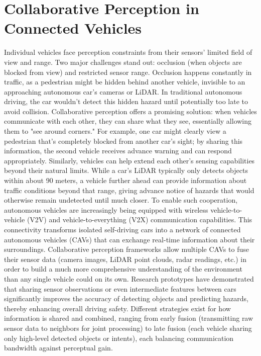 \section{Collaborative Perception in Connected Vehicles}
Individual vehicles face perception constraints from their sensors' limited field of view and range. Two major challenges stand out: occlusion (when objects are blocked from view) and restricted sensor range. Occlusion happens constantly in traffic, as a pedestrian might be hidden behind another vehicle, invisible to an approaching autonomous car's cameras or LiDAR.
In traditional autonomous driving, the car wouldn't detect this hidden hazard until potentially too late to avoid collision. Collaborative perception offers a promising solution: when vehicles communicate with each other, they can share what they see, essentially allowing them to "see around corners."
For example, one car might clearly view a pedestrian that's completely blocked from another car's sight; by sharing this information, the second vehicle receives advance warning and can respond appropriately. Similarly, vehicles can help extend each other's sensing capabilities beyond their natural limits.
While a car's LiDAR typically only detects objects within about 90 meters, a vehicle further ahead can provide information about traffic conditions beyond that range, giving advance notice of hazards that would otherwise remain undetected until much closer.
To enable such cooperation, autonomous vehicles are increasingly being equipped with wireless vehicle-to-vehicle (V2V) and vehicle-to-everything (V2X) communication capabilities. This connectivity transforms isolated self-driving cars into a network of connected autonomous vehicles (CAVs) that can exchange real-time information about their surroundings.
Collaborative perception frameworks allow multiple CAVs to fuse their sensor data (camera images, LiDAR point clouds, radar readings, etc.) in order to build a much more comprehensive understanding of the environment than any single vehicle could on its own.
Research prototypes have demonstrated that sharing sensor observations or even intermediate features between cars significantly improves the accuracy of detecting objects and predicting hazards, thereby enhancing overall driving safety.
Different strategies exist for how information is shared and combined, ranging from early fusion (transmitting raw sensor data to neighbors for joint processing) to late fusion (each vehicle sharing only high-level detected objects or intents), each balancing communication bandwidth against perceptual gain.
